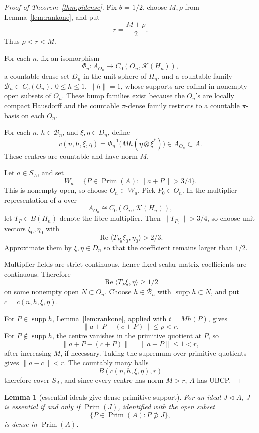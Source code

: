 \documentclass[11pt]{article}
\newtheorem{lemma}{Lemma}
\newcommand{\Kcal}{\mathcal K}
\newcommand{\Prim}{\operatorname{Prim}}
\newcommand{\supp}{\operatorname{supp}}
\begin{document}
\begin{proof}[Proof of Theorem~\ref{thm:pidense}]
Fix \(\theta=1/2\), choose \(M,\rho\) from Lemma~\ref{lem:rankone}, and put
\[
        r=\frac{M+\rho}{2}.
\]
Thus \(\rho<r<M\).

For each \(n\), fix an isomorphism
\[
        \Phi_n:A_{O_n}\to C_0(O_n,\Kcal(H_n)),
\]
a countable dense set \(D_n\) in the unit sphere of \(H_n\), and a countable
family \(\mathcal B_n\subset C_c(O_n)\), \(0\le h\le1\), \(\|h\|=1\), whose
supports are cofinal in nonempty open subsets of \(O_n\).  These bump
families exist because the \(O_n\)'s are locally compact Hausdorff and the
countable \(\pi\)-dense family restricts to a countable \(\pi\)-basis on each
\(O_n\).

For each \(n\), \(h\in\mathcal B_n\), and \(\xi,\eta\in D_n\), define
\[
        c(n,h,\xi,\eta)
        =
        \Phi_n^{-1}\bigl(Mh(\eta\otimes\xi^*)\bigr)
        \in A_{O_n}\subset A.
\]
These centres are countable and have norm \(M\).

Let \(a\in S_A\), and set
\[
        W_a=\{P\in\Prim(A):\|a+P\|>3/4\}.
\]
This is nonempty open, so choose \(O_n\subset W_a\).  Pick \(P_0\in O_n\).
In the multiplier representation of \(a\) over
\[
        A_{O_n}\cong C_0(O_n,\Kcal(H_n)),
\]
let \(T_P\in B(H_n)\) denote the fibre multiplier.  Then
\(\|T_{P_0}\|>3/4\), so choose unit vectors \(\xi_0,\eta_0\) with
\[
        \operatorname{Re}\langle T_{P_0}\xi_0,\eta_0\rangle>2/3.
\]
Approximate them by \(\xi,\eta\in D_n\) so that the coefficient remains
larger than \(1/2\).

Multiplier fields are strict-continuous, hence fixed scalar matrix
coefficients are continuous.  Therefore
\[
        \operatorname{Re}\langle T_P\xi,\eta\rangle\ge1/2
\]
on some nonempty open \(N\subset O_n\).  Choose \(h\in\mathcal B_n\) with
\(\supp h\subset N\), and put \(c=c(n,h,\xi,\eta)\).

For \(P\in\supp h\), Lemma~\ref{lem:rankone}, applied with
\(t=Mh(P)\), gives
\[
        \|a+P-(c+P)\|\le\rho<r.
\]
For \(P\notin\supp h\), the centre vanishes in the primitive quotient at
\(P\), so
\[
        \|a+P-(c+P)\|=\|a+P\|\le1<r,
\]
after increasing \(M\), if necessary.  Taking the supremum over primitive
quotients gives \(\|a-c\|<r\).  The countably many balls
\[
        B(c(n,h,\xi,\eta),r)
\]
therefore cover \(S_A\), and since every centre has norm \(M>r\), \(A\) has
UBCP.
\end{proof}

\begin{lemma}[essential ideals give dense primitive support]
\label{lem:essential}
For an ideal \(J\triangleleft A\), \(J\) is essential if and only if
\(\Prim(J)\), identified with the open subset
\[
        \{P\in\Prim(A):P\not\supset J\},
\]
is dense in \(\Prim(A)\).
\end{lemma}
\end{document}
